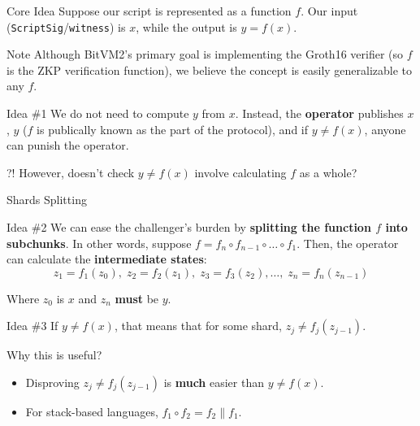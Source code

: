 \documentclass{zkdl-presentation-template}
\newcommand{\cmark}{\textcolor{green!65!black}{\ding{51}}}%
\begin{document}
    \begin{frame}{Core Idea}
        Suppose our script is represented as a function $f$. Our input (\texttt{ScriptSig}/\texttt{witness}) is $x$, while the output is $y=f(x)$.

        \begin{block}{Note}
            Although BitVM2's primary goal is implementing the Groth16 verifier (so $f$ is the ZKP verification function), we believe the concept is easily generalizable to any $f$.
        \end{block}
    
        \begin{block}{Idea \#1}
            We do not need to compute $y$ from $x$. Instead, the \textbf{operator} publishes $x$, $y$ ($f$ is publically known as the part of the protocol), and if $y \neq f(x)$, anyone can punish the operator. 
        \end{block}

        \begin{alertblock}{?!}
            However, doesn't check $y \neq f(x)$ involve calculating $f$ as a whole?
        \end{alertblock}
    \end{frame}

    \begin{frame}{Shards Splitting}
        \begin{block}{Idea \#2}
            We can ease the challenger's burden by \textbf{splitting the function $f$ into subchunks}. In other words, suppose $f=f_n \circ f_{n-1} \circ \dots \circ f_1$. Then, the operator can calculate the \textbf{intermediate states}:
            \begin{equation*}
                z_1 = f_1(z_0), \; z_2 = f_2(z_1), \; z_3 = f_3(z_2), \dots, \; z_n = f_n(z_{n-1})
            \end{equation*}

            Where $z_0$ is $x$ and $z_n$ \textbf{must} be $y$.
        \end{block}

        \begin{block}{Idea \#3}
            If $y \neq f(x)$, that means that for some shard, $z_{j} \neq f_{j}(z_{j-1})$. 
        \end{block}

        \begin{block}{Why this is useful?}
            \begin{itemize}[label=\cmark]
                \item Disproving $z_j \neq f_j(z_{j-1})$ is \textbf{much} easier than $y \neq f(x)$.
                \item For stack-based languages, $f_1 \circ f_2 = f_2 \parallel f_1$.
            \end{itemize}
        \end{block}
    \end{frame}
\end{document}
